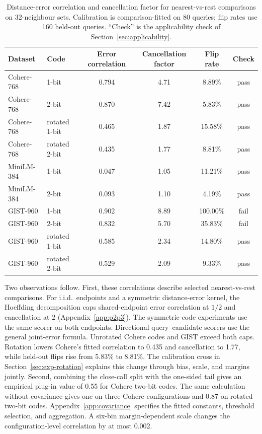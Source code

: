 \documentclass[twoside,11pt]{article}
\begin{document}
\begin{table}[tbp]
\centering
\small

\begin{tabular}{llcccc}
\toprule
Dataset & Code & Error correlation & Cancellation factor & Flip rate & Check \\
\midrule
Cohere-768 & 1-bit & 0.794 & 4.71 & 8.89\% & pass \\
Cohere-768 & 2-bit & 0.870 & 7.42 & 5.83\% & pass \\
Cohere-768 & rotated 1-bit & 0.465 & 1.87 & 15.58\% & pass \\
Cohere-768 & rotated 2-bit & 0.435 & 1.77 & 8.81\% & pass \\
MiniLM-384 & 1-bit & 0.047 & 1.05 & 11.21\% & pass \\
MiniLM-384 & 2-bit & 0.093 & 1.10 & 4.19\% & pass \\
GIST-960 & 1-bit & 0.902 & 8.89 & 100.00\% & fail \\
GIST-960 & 2-bit & 0.832 & 5.70 & 35.83\% & fail \\
GIST-960 & rotated 1-bit & 0.585 & 2.34 & 14.80\% & pass \\
GIST-960 & rotated 2-bit & 0.529 & 2.09 & 9.33\% & pass \\
\bottomrule
\end{tabular}

\small
\caption{Distance-error correlation and cancellation factor for nearest-vs-rest comparisons on 32-neighbour sets. Calibration is comparison-fitted on 80 queries; flip rates use 160 held-out queries. ``Check'' is the applicability check of Section~\ref{sec:applicability}.}
\label{tab:covariance}
\end{table}

Two observations follow. First, these correlations describe selected nearest-vs-rest comparisons. For i.i.d.\ endpoints and a symmetric distance-error kernel, the Hoeffding decomposition caps shared-endpoint error correlation at $1/2$ and cancellation at $2$ (Appendix~\ref{app:p2p3}). The symmetric-code experiments use the same scorer on both endpoints. Directional query--candidate scorers use the general joint-error formula. Unrotated Cohere codes and GIST exceed both caps. Rotation lowers Cohere's fitted correlation to 0.435 and cancellation to 1.77, while held-out flips rise from 5.83\% to 8.81\%. The calibration cross in Section~\ref{sec:exp-rotation} explains this change through bias, scale, and margins jointly. Second, combining the close-call split with the one-sided tail gives an empirical plug-in value of 0.55 for Cohere two-bit codes. The same calculation without covariance gives one on three Cohere configurations and 0.87 on rotated two-bit codes. Appendix~\ref{app:covariance} specifies the fitted constants, threshold selection, and aggregation. A six-bin margin-dependent scale changes the configuration-level correlation by at most 0.002.
\end{document}
